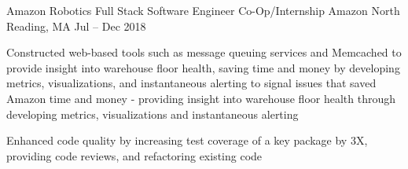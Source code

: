 \begin{cventries}
{\begin{cvitems}
       \end{cvitems}
     }
	 \cventry
    {Amazon Robotics Full Stack Software Engineer Co-Op/Internship} %
    {Amazon} %
    {North Reading, MA} %
    {Jul – Dec 2018} %
    {
    	\begin{cvitems} %
    		    \item {Constructed web-based tools such as message queuing services and Memcached to provide insight into warehouse floor health, saving time and money by developing metrics, visualizations, and instantaneous alerting to signal issues that saved Amazon time and money - providing insight into warehouse floor health through developing metrics, visualizations and instantaneous alerting}
    			\item {Enhanced code quality by increasing test coverage of a key package by 3X, providing code reviews, and refactoring existing code}
    		 \end{cvitems}
    }



\end{cventries}
